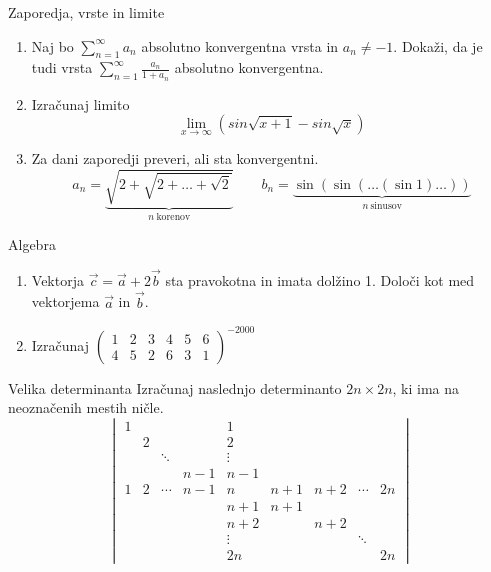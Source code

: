 \begin{frame}{Zaporedja, vrste in limite}
	\begin{enumerate}
		\item 
		Naj bo $\sum_{n=1}^{\infty} a_n$ absolutno konvergentna vrsta in $a_n \ne -1$.
		Dokaži, da je tudi vrsta $\sum_{n=1}^\infty \frac{a_n}{1+a_n}$
		absolutno konvergentna.

		\item
		Izračunaj limito
		$$\lim_{x\longrightarrow\infty}(sin\sqrt{x+1}- sin\sqrt{x})$$

		\item
		Za dani zaporedji preveri, ali sta konvergentni.
		$$ a_n = \underbrace{\sqrt{2+\sqrt{2+\dots+\sqrt{2}}}}_{n~\text{korenov}} \qquad
		 b_n = \underbrace{\sin(\sin(\dots(\sin 1)\dots))}_{n~\text{sinusov}} $$
	\end{enumerate}
\end{frame}

\begin{frame}{Algebra}
	\begin{enumerate}
		\item
		Vektorja $\vec{c} = \vec{a} + 2 \vec{b} $
		sta pravokotna in imata dolžino 1. Določi kot med vektorjema $\vec{a}$ in $\vec{b}$.
		\item 
		Izračunaj
		$ \begin{pmatrix}
1 & 2 & 3 & 4 & 5 & 6\\
4 & 5 & 2 & 6 & 3 & 1
\end{pmatrix}^{-2000}  $
	\end{enumerate}
\end{frame}

\begin{frame}{Velika determinanta}
	Izračunaj naslednjo determinanto $2n \times 2n$, ki ima na neoznačenih mestih ničle.
 \[
\begin{vmatrix}
1	&  		&   	&		& 1 	&  		&  		& 		& 		 \\
 	& 2 	&  		&		& 2 	&  		& 		& 		& 		 \\
 	&  		& \ddots&		& \vdots&  		&  		& 		& 		 \\
 	& 		&    	&n-1	& n-1 	&  		& 		& 		& 		 \\
1	& 2 	& \cdots&n-1	& n 	& n+1 	& n+2	&\cdots &2n 	 \\
 	&		& 		&		& n+1 	& n+1 	& 	 	& 	 	& 	 	 \\
	& 		& 		&		& n+2	& 		& n+2	& 		& 		 \\
 	& 	 	& 		&		& \vdots&   	& 		& \ddots&  		\\
	&		&		&		&2n		&		&		&		&2n
\end{vmatrix}
\]

\end{frame}

